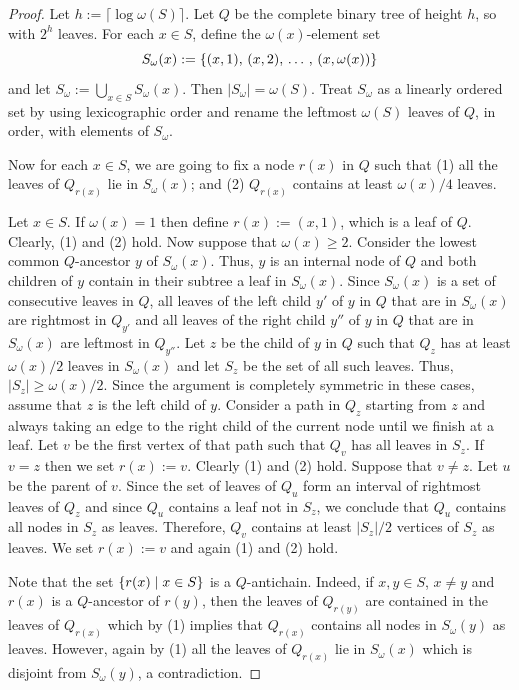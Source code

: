 \documentclass{patmorin}
\renewcommand{\geq}{\geqslant}
\DeclarePairedDelimiter{\set}{\{}{\}}
\begin{document}
\begin{proof}
  Let $h:=\lceil\log\omega(S)\rceil$.
  Let $Q$ be the complete binary tree of height $h$, so with $2^h$ leaves.
  For each $x\in S$, define the $\omega(x)$-element set
  \[  S_{\omega}(x):=\set{(x,1),\,(x,2),\,\ldots\,,\,(x,\omega(x))}\]
  and let $S_\omega:=\bigcup_{x\in S}S_{\omega}(x)$.  Then $|S_\omega|=\omega(S)$.  Treat $S_{\omega}$ as a linearly ordered set by using lexicographic order and rename the leftmost $\omega(S)$ leaves of $Q$, in order, with elements of $S_{\omega}$.

  Now for each $x\in S$, we are going to fix a node $r(x)$ in $Q$ such that
  (1) all the leaves of $Q_{r(x)}$ lie in $S_{\omega}(x)$; and
  (2) $Q_{r(x)}$ contains at least $\omega(x)/4$ leaves.

  Let $x\in S$.
  If $\omega(x)=1$ then define $r(x):=(x,1)$, which is a leaf of $Q$.
  Clearly, (1) and (2) hold.
  Now suppose that $\omega(x)\geq2$.
  Consider the lowest common $Q$-ancestor $y$ of $S_{\omega}(x)$.
  Thus, $y$ is an internal node of $Q$ and
  both children of $y$ contain in their subtree a leaf in $S_{\omega}(x)$.
  Since $S_{\omega}(x)$ is a set of consecutive leaves in $Q$,
  all leaves of the left child $y'$ of $y$ in $Q$ that are in $S_{\omega}(x)$ are rightmost in $Q_{y'}$ and
  all leaves of the right child $y''$ of $y$ in $Q$ that are in $S_{\omega}(x)$ are leftmost in $Q_{y''}$.
  Let $z$ be the child of $y$ in $Q$ such that $Q_z$ has at least $\omega(x)/2$ leaves in $S_{\omega}(x)$ and let $S_z$ be the set of all such leaves.
  Thus, $|S_z|\geq \omega(x)/2$.
  Since the argument is completely symmetric in these cases, assume that $z$ is the left child of $y$.
  Consider a path in $Q_z$ starting from $z$ and always taking an edge to the right child of the current node until we finish at a leaf.
  Let $v$ be the first vertex of that path such that $Q_v$ has all leaves in $S_z$.
  If $v=z$ then we set $r(x):=v$. Clearly (1) and (2) hold.
  Suppose that $v\neq z$.
  Let $u$ be the parent of $v$.
  Since the set of leaves of $Q_u$ form an interval of rightmost leaves of $Q_z$ and since $Q_u$ contains a leaf not in $S_z$, we conclude that $Q_u$ contains all nodes in $S_z$ as leaves.
  Therefore, $Q_v$ contains at least $|S_z|/2$ vertices of $S_z$ as leaves.
  We set $r(x):=v$ and again (1) and (2) hold.

  Note that the set $\set{r(x) \mid x\in S}$ is a $Q$-antichain.
  Indeed, if $x,y\in S$, $x\neq y$ and $r(x)$ is a $Q$-ancestor of  $r(y)$, then the leaves of $Q_{r(y)}$ are contained in the leaves of $Q_{r(x)}$ which by (1) implies that $Q_{r(x)}$ contains all nodes in $S_{\omega}(y)$ as leaves.
  However, again by (1) all the leaves of $Q_{r(x)}$ lie in $S_{\omega}(x)$ which is disjoint from $S_{\omega}(y)$, a contradiction.


\end{proof}
\end{document}
